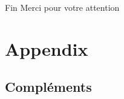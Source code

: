 \documentclass[compress]{beamer}
\begin{document}
%






\begin{frame}{Fin}
  \center
  Merci pour votre attention
\end{frame}
\section*{Appendix}
\appendix
\subsection*{Compléments}

\end{document}
